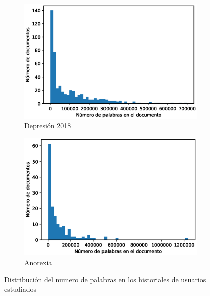 
\begin{figure}[!ht]
    
    \begin{subfigure}[b]{0.5\textwidth}
        \includegraphics[width=\textwidth]{sections/figures/length_dist.eps}
        \caption{Depresión 2018}
    \end{subfigure}
    \hfill
    \begin{subfigure}[b]{0.5\textwidth}
        \includegraphics[width=\textwidth]{sections/figures/length_dist_anorexia.eps}
        \caption{Anorexia}
    \end{subfigure}
    \caption{Distribución del numero de palabras en los historiales de usuarios estudiados}
    \label{fig:erisk_freq}
\end{figure}


